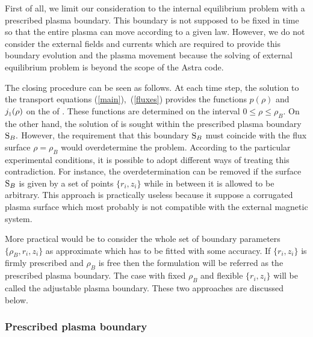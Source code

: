 First of all, we limit our consideration to the internal equilibrium
problem with a prescribed plasma boundary. 
This boundary is not supposed to be fixed in time so that
the entire plasma can move according to a given law.
However, we do not consider the external fields and currents which are
required to provide this boundary evolution and the plasma movement
because the solving of external equilibrium problem is beyond the scope
of the Astra code.  

The closing procedure can be seen as follows.
At each time step, the solution to the transport equations
(\ref{main}),~(\ref{fluxes}) provides the functions $p(\rho)$ and
$j_{\scriptscriptstyle\parallel}(\rho)$ on the \rhs of .
These functions are determined on the interval $0\leq\rho\leq\rho_B$.
On the other hand, the solution of  is sought within the
prescribed plasma boundary $\mbox{\cal S}_B.$  
However, the requirement that this boundary $\mbox{\cal S}_B$ must
coincide with the flux surface $\rho=\rho_B$ would overdetermine the
problem. 
According to the particular experimental conditions, it is possible to
adopt different ways of treating this contradiction.
For instance, the overdetermination can be removed if the surface
$\mbox{\cal S}_B$ is given by a set of points $\{r_i,z_i\}$ while in
between it is allowed to be arbitrary.
This approach is practically useless because it suppose a corrugated
plasma surface which most probably is not compatible with the external
magnetic system.

More practical would be to consider the whole set of boundary parameters 
$\{\rho_B,r_i,z_i\}$ as approximate which has to be fitted with some
accuracy. 
If $\{r_i,z_i\}$ is firmly prescribed and $\rho_B$ is free then the
formulation will be referred as  the prescribed plasma boundary. 
The case with fixed $\rho_B$ and flexible $\{r_i,z_i\}$ will be called
the adjustable plasma boundary. 
These two approaches are discussed below. 

\subsubsection{Prescribed plasma boundary}

